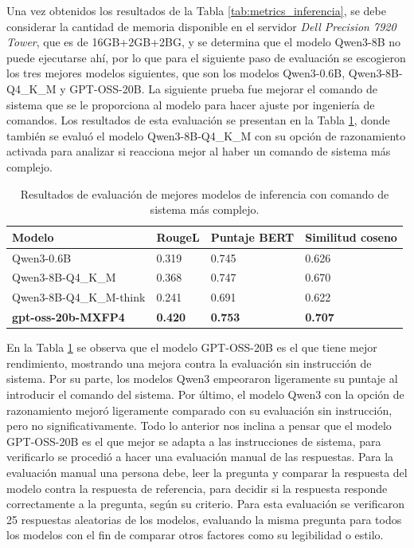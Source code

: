 Una vez obtenidos los resultados de la Tabla \ref{tab:metrics_inferencia},
se debe considerar la cantidad de memoria disponible en el servidor
\textit{Dell Precision 7920 Tower}, que es de 16GB+2GB+2BG, y se determina que el modelo
Qwen3-8B no puede ejecutarse ahí, por lo que para el siguiente
paso de evaluación se escogieron los tres mejores modelos siguientes, que
son los modelos Qwen3-0.6B, Qwen3-8B-Q4\_K\_M y GPT-OSS-20B. La siguiente
prueba fue mejorar el comando de sistema que se le proporciona al modelo
para hacer ajuste por ingeniería de comandos. Los resultados de esta evaluación
se presentan en la Tabla \ref{tab:metrics_prompt}, donde también se evaluó
el modelo Qwen3-8B-Q4\_K\_M con su opción de razonamiento activada para
analizar si reacciona mejor al haber un comando de sistema más complejo.

\begin{table}[!ht]
    \centering
    \begin{tabular}{|l|l|l|l|}
        \hline
        Modelo                     & RougeL         & Puntaje BERT   & Similitud coseno \\ \hline
        Qwen3-0.6B                 & 0.319          & 0.745          & 0.626            \\ \hline
        Qwen3-8B-Q4\_K\_M          & 0.368          & 0.747          & 0.670            \\ \hline
        Qwen3-8B-Q4\_K\_M-think    & 0.241          & 0.691          & 0.622            \\ \hline
        \textbf{gpt-oss-20b-MXFP4} & \textbf{0.420} & \textbf{0.753} & \textbf{0.707}   \\ \hline
    \end{tabular}
    \caption{Resultados de evaluación de mejores modelos de inferencia con
        comando de sistema más complejo.}
    \label{tab:metrics_prompt}
\end{table}

En la Tabla \ref{tab:metrics_prompt} se observa que el modelo GPT-OSS-20B
es el que tiene mejor rendimiento, mostrando una mejora contra la evaluación sin
instrucción de sistema. Por su parte, los modelos Qwen3 empeoraron ligeramente su puntaje
al introducir el comando del sistema. Por último, el modelo Qwen3 con la
opción de razonamiento mejoró ligeramente comparado con su evaluación sin
instrucción, pero no significativamente. Todo lo anterior nos inclina a pensar
que el modelo GPT-OSS-20B es el que mejor se adapta a las instrucciones de sistema,
para verificarlo se procedió a hacer una evaluación manual de las respuestas.
Para la evaluación manual una persona debe, leer la pregunta y comparar la respuesta del modelo
contra la respuesta de referencia, para decidir si la respuesta responde correctamente
a la pregunta, según su criterio. Para esta evaluación se verificaron
25 respuestas aleatorias de los modelos, evaluando la misma pregunta para todos
los modelos con el fin de comparar otros factores como su legibilidad o estilo.

